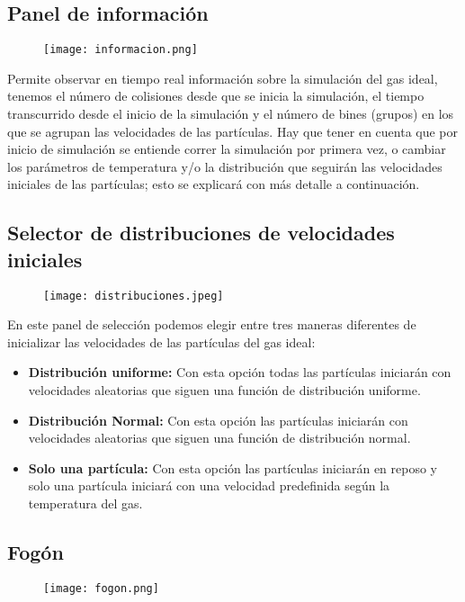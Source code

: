 \documentclass[11pt]{article}
\begin{document}
\subsection{Panel de información}
\begin{figure}[H]
\centerline{\texttt{[image: informacion.png]}}
\end{figure}

Permite observar en tiempo real información sobre la simulación del gas ideal, tenemos el número de colisiones desde que se inicia la simulación, el tiempo transcurrido desde el inicio de la simulación y el número de bines (grupos) en los que se agrupan las velocidades de las partículas. Hay que tener en cuenta que por inicio de simulación se entiende correr la simulación por primera vez, o cambiar los parámetros de temperatura y/o la distribución que seguirán las velocidades iniciales de las partículas; esto se explicará con más detalle a continuación.

\subsection{Selector de distribuciones de velocidades iniciales}
\begin{figure}[H]
\centerline{\texttt{[image: distribuciones.jpeg]}}
\end{figure}

En este panel de selección podemos elegir entre tres maneras diferentes de inicializar las velocidades de las partículas del gas ideal:
\begin{itemize}
    \item \textbf{Distribución uniforme:} Con esta opción todas las partículas iniciarán con velocidades aleatorias que siguen una función de distribución uniforme.
    
    \item \textbf{Distribución Normal:} Con esta opción las partículas iniciarán con velocidades aleatorias que siguen una función de distribución normal.
    
    \item \textbf{Solo una partícula:} Con esta opción las partículas iniciarán en reposo y solo una partícula iniciará con una velocidad predefinida según la temperatura del gas.
    
\end{itemize}

\subsection{Fogón}
\begin{figure}[H]
\centerline{\texttt{[image: fogon.png]}}
\end{figure}
\end{document}
